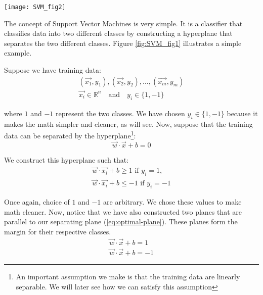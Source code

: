 
\begin{figure*}[!tb]
	\texttt{[image: SVM\_fig2]}
	\centering
	\caption{Notice that the best hyperplane that separates the two classes is as far away from the margin planes as possible. Any other separating hyperplane would not seem \textit{natural} for the data we have.}
	\label{fig:SVM_fig1}
\end{figure*}

The concept of Support Vector Machines is very simple. It is a classifier that classifies data into two different classes by constructing a hyperplane that separates the two different classes. Figure \ref{fig:SVM_fig1} illustrates a simple example.

Suppose we have training data:
\begin{gather}
(\vec{x_1}, y_1),  (\vec{x_2}, y_2), \dots, (\vec{x_m}, y_m) \nonumber\\
\vec{x_i} \in \mathbb{R}^{n} \quad\text{and}\quad y_i \in \{1, -1\} \nonumber
\end{gather}

where $1$ and $-1$ represent the two classes. We have chosen $ y_i \in \{1, -1\}$ because it makes the math simpler and cleaner, as will see. Now, suppose that the training data can be separated by the hyperplane\footnote{An important assumption we make is that the training data are linearly separable. We will later see how we can satisfy this assumption}:
\begin{equation}
\vec{w}\cdot\vec{x} + b = 0 \label{eq:optimal-plane}
\end{equation}

We construct this hyperplane such that:
\begin{gather}
\vec{w}\cdot\vec{x_i} + b \geq 1 \text{ if $y_i = 1$,} \label{eq:class-1} \\
\vec{w}\cdot\vec{x_i} + b \leq -1 \text{ if $y_i = -1$} \label{eq:notclass-1} 
\end{gather}

Once again, choice of $1$ and $-1$ are arbitrary. We chose these values to make math cleaner. Now, notice that we have also constructed two planes that are parallel to our separating plane (\ref{eq:optimal-plane}). These planes form the margin for their respective classes.
\begin{gather}
\vec{w}\cdot\vec{x} + b = 1 \label{eq:margin-class-1} \\
\vec{w}\cdot\vec{x} + b = -1 \label{eq:margin-notclass-1}
\end{gather}

